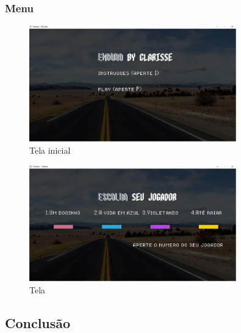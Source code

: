 \documentclass[a4paper]{article}
\begin{document}
\subsubsection{Menu}
\begin{figure}[H]
\centering
\includegraphics[width=0.8\textwidth]{menutela.png}
\caption{Tela inicial}
\end{figure}


    \begin{figure}[H]
    \centering
    \includegraphics[width=0.8\textwidth]{menuplay.png}
    \caption{Tela }
    \end{figure}


\subsection{Conclusão}
\end{document}
